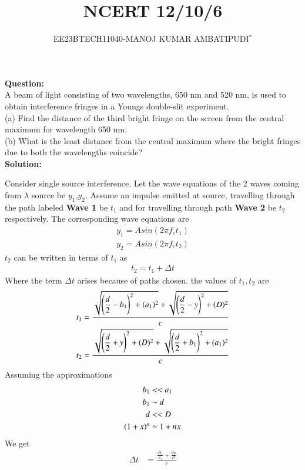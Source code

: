 \documentclass[journal,12pt,twocolumn]{IEEEtran}
\theoremstyle{remark}
\begin{document}

\vspace{3cm}
\title{\textbf{NCERT 12/10/6}}
\author{EE23BTECH11040-MANOJ KUMAR AMBATIPUDI$^{*}$%
}
\maketitle
\newpage
\bigskip
\renewcommand{\thefigure}{\theenumi}
\renewcommand{\thetable}{\theenumi}
\textbf{Question:}
\\
A beam of light consisting of two wavelengths, 650 nm and 520 nm, is used to
obtain interference fringes in a Youngs double-slit experiment.\\
(a) Find the distance of the third bright fringe on the screen from
the central maximum for wavelength 650 nm.\\
(b) What is the least distance from the central maximum where the
bright fringes due to both the wavelengths coincide?
\\
\textbf{Solution:}

Consider single source interference. Let the wave equations of the 2 waves coming from $\lambda$ source be $y_1$,$y_2$.
Assume an impulse emitted at source, travelling through the path labeled \textbf{Wave 1} be $t_1$ and for travelling through path \textbf{Wave 2} be $t_2$ respectively. The corresponding wave equations are
\begin{align}
    y_1 = Asin(2\pi f_c t_1)\\
    y_2 = Asin(2\pi f_c t_2)\label{12/10/6/1}
\end{align}
$t_2$ can be written in terms of $t_1$ as
\begin{align}
    t_2 = t_1 + \Delta t
\end{align}
Where the term $\Delta t$ arises because of paths chosen.
the values of $t_1, t_2$ are 
\begin{align}
    t_1 &= \frac{\sqrt{\left(\dfrac{d}{2}-b_1\right)^{2}+(a_1)^{2}} + \sqrt{\left(\dfrac{d}{2}-y\right)^{2}+(D)^{2}}}{c}\\
    t_2 &= \frac{\sqrt{\left(\dfrac{d}{2}+y\right)^{2}+(D)^{2}} + \sqrt{\left(\dfrac{d}{2}+b_1\right)^{2}+(a_1)^{2}}}{c}
\end{align}
Assuming the approximations 
\begin{align}
    b_1&<<a_1\\
    b_1&\sim d\\
    d&<<D\\
    \left(1+x\right)^{n}&\simeq1+nx
\end{align}
We get
\begin{align}
    \Delta t &= \frac{\frac{db_1}{a_1} + \frac{dy}{D}}{c} \label{12/10/6/2}
\end{align}
\end{document}
